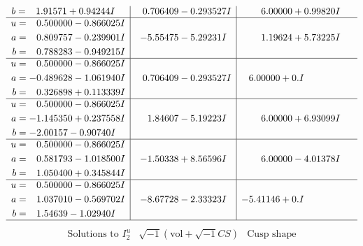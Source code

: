 \documentclass[1p]{elsarticle_modified}
\theoremstyle{definition}
\newcommand{\I}{\sqrt{-1}}
\begin{document}
$$\begin{array}{c|c|c}
\begin{aligned}
b &= \phantom{-}1.91571 + 0.94244 I\end{aligned}
 & \phantom{-}0.706409 - 0.293527 I & \phantom{-}6.00000 + 0.99820 I \\ \hline\begin{aligned}
u &= \phantom{-}0.500000 - 0.866025 I \\
a &= \phantom{-}0.809757 - 0.239901 I \\
b &= \phantom{-}0.788283 - 0.949215 I\end{aligned}
 & -5.55475 - 5.29231 I & \phantom{-}1.19624 + 5.73225 I \\ \hline\begin{aligned}
u &= \phantom{-}0.500000 - 0.866025 I \\
a &= -0.489628 - 1.061940 I \\
b &= \phantom{-}0.326898 + 0.113339 I\end{aligned}
 & \phantom{-}0.706409 - 0.293527 I & \phantom{-}6.00000 + 0. I\phantom{ +0.000000I} \\ \hline\begin{aligned}
u &= \phantom{-}0.500000 - 0.866025 I \\
a &= -1.145350 + 0.237558 I \\
b &= -2.00157 - 0.90740 I\end{aligned}
 & \phantom{-}1.84607 - 5.19223 I & \phantom{-}6.00000 + 6.93099 I \\ \hline\begin{aligned}
u &= \phantom{-}0.500000 - 0.866025 I \\
a &= \phantom{-}0.581793 - 1.018500 I \\
b &= \phantom{-}1.050400 + 0.345844 I\end{aligned}
 & -1.50338 + 8.56596 I & \phantom{-}6.00000 - 4.01378 I \\ \hline\begin{aligned}
u &= \phantom{-}0.500000 - 0.866025 I \\
a &= \phantom{-}1.037010 - 0.569702 I \\
b &= \phantom{-}1.54639 - 1.02940 I\end{aligned}
 & -8.67728 - 2.33323 I & -5.41146 + 0. I\phantom{ +0.000000I}\\
 \hline 
 \end{array}$$\newpage$$\begin{array}{c|c|c}  
\text{Solutions to }I^u_{2}& \I (\text{vol} + \sqrt{-1}CS) & \text{Cusp shape}\\
 \hline 
\begin{aligned}

\end{aligned}
\end{array}$$
\end{document}
